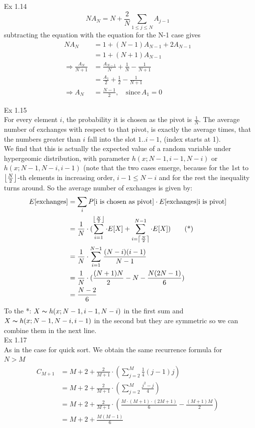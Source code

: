 \documentclass{article}
\DeclarePairedDelimiter\ceil{\lceil}{\rceil}
\DeclarePairedDelimiter\floor{\lfloor}{\rfloor}
\begin{document}
  

Ex 1.14 \\
\[
	N A_N = N + \frac{2}{N}\sum_{1 \leq j \leq N}A_{j-1}
\]
subtracting the equation with the equation for the N-1 case gives
\begin{align*}
	N A_N &= 1 + (N - 1) A_{N-1} + 2A_{N-1} \\
		&= 1 + (N+1) A_{N-1} \\
	\Rightarrow \frac{A_N}{N+1} &= \frac{A_{N-1}}{N} + \frac{1}{N} - \frac{1}{N+1} \\
	&= \frac{A_1}{2} + \frac{1}{2} - \frac{1}{N+1} \\
	\Rightarrow A_N
	&= \frac{N-1}{2},\quad \text{since} \, A_1 = 0
\end{align*}

Ex 1.15\\
For every element $i$, the probability it is chosen as the pivot is $\frac{1}{N}$. The average number of exchanges with respect to that pivot, is exactly the average times, that the numbers greater than $i$ fall into the slot $1..i-1$, (index starts at 1). \\
We find that this is actually the expected value of a random variable under hypergeomic distribution, with parameter $h(x;N-1,i-1,N-i)$ or $h(x;N-1,N-i,i-1)$ (note that the two cases emerge, because for the 1st to $\floor*{\frac{N}{2}}$-th elements in increasing order, $i-1 \leq N-i$ and for the rest the inequality turns around. So the average number of exchanges is given by:
\begin{align*}
	E[\text{exchanges}] &= \sum_{i} P[\text{i is chosen as pivot}] \cdot E[\text{exchanges}| \text{i is pivot}] \\
	&= \frac{1}{N} \cdot (\sum_{i=1}^{\floor*{\frac{N}{2}}} \cdot E[X] + \sum_{i = \ceil*{\frac{N}{2}}}^{N-1} \cdot E[X]) \tag{*}\\
	&= \frac{1}{N}\cdot\sum_{i = 1}^{N-1} \frac{(N-i)(i-1)}{N-1} \\
	&= \frac{1}{N} \cdot (\frac{(N+1)N}{2} - N - \frac{N(2N-1)}{6})\\
	&= \frac{N-2}{6}
\end{align*}
To the *: $X \thicksim h(x;N-1,i-1,N-i)$ in the first sum and \\$X \thicksim h(x;N-1, N-i,i-1)$ in the second but they are symmetric so we can combine them in the next line.\\
Ex 1.17 \\
As in the case for quick sort. We obtain the same recurrence formula for\\ 
$N > M$
\begin{align*}
	C_{M+1} &= M + 2 + \frac{2}{M+1}\cdot(\sum_{j = 2}^{M}\frac{1}{4}(j-1)j) \\
		    &= M + 2 + \frac{2}{M + 1} \cdot (\sum_{j = 2}^{M} \frac{j^2-j}{4}) \\
		    &= M + 2 + \frac{2}{M+1} \cdot (\frac{M\cdot(M+1)\cdot(2M+1)}{6} - \frac{(M+1)M}{2}) \\
		    &= M + 2 + \frac{M(M-1)}{6}
\end{align*}
\end{document}
